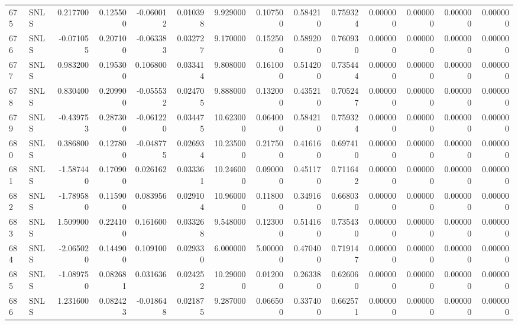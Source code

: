 \begin{tabular}{llrrrrrrrrrrrr}
675 &   SNLS &  0.217700 &      0.125500 & -0.060012 &    0.010398 &   9.929000 &      0.107500 &   0.584210 &  0.759324 &  0.000000 &   0.000000 &     0.000000 &     0.000000 \\
676 &   SNLS & -0.071055 &      0.207100 & -0.063383 &    0.032727 &   9.170000 &      0.152500 &   0.589200 &  0.760930 &  0.000000 &   0.000000 &     0.000000 &     0.000000 \\
677 &   SNLS &  0.983200 &      0.195300 &  0.106800 &    0.033414 &   9.808000 &      0.161000 &   0.514200 &  0.735444 &  0.000000 &   0.000000 &     0.000000 &     0.000000 \\
678 &   SNLS &  0.830400 &      0.209900 & -0.055532 &    0.024705 &   9.888000 &      0.132000 &   0.435210 &  0.705247 &  0.000000 &   0.000000 &     0.000000 &     0.000000 \\
679 &   SNLS & -0.439753 &      0.287300 & -0.061220 &    0.034475 &  10.623000 &      0.064000 &   0.584210 &  0.759324 &  0.000000 &   0.000000 &     0.000000 &     0.000000 \\
680 &   SNLS &  0.386800 &      0.127800 & -0.048775 &    0.026934 &  10.235000 &      0.217500 &   0.416160 &  0.697410 &  0.000000 &   0.000000 &     0.000000 &     0.000000 \\
681 &   SNLS & -1.587440 &      0.170900 &  0.026162 &    0.033361 &  10.246000 &      0.090000 &   0.451170 &  0.711642 &  0.000000 &   0.000000 &     0.000000 &     0.000000 \\
682 &   SNLS & -1.789580 &      0.115900 &  0.083956 &    0.029104 &  10.960000 &      0.118000 &   0.349160 &  0.668030 &  0.000000 &   0.000000 &     0.000000 &     0.000000 \\
683 &   SNLS &  1.509900 &      0.224100 &  0.161600 &    0.033268 &   9.548000 &      0.123000 &   0.514160 &  0.735430 &  0.000000 &   0.000000 &     0.000000 &     0.000000 \\
684 &   SNLS & -2.065020 &      0.144900 &  0.109100 &    0.029330 &   6.000000 &      5.000000 &   0.470400 &  0.719147 &  0.000000 &   0.000000 &     0.000000 &     0.000000 \\
685 &   SNLS & -1.089750 &      0.082681 &  0.031636 &    0.024252 &  10.290000 &      0.012000 &   0.263380 &  0.626060 &  0.000000 &   0.000000 &     0.000000 &     0.000000 \\
686 &   SNLS &  1.231600 &      0.082423 & -0.018648 &    0.021875 &   9.287000 &      0.066500 &   0.337400 &  0.662571 &  0.000000 &   0.000000 &     0.000000 &     0.000000 \\

\end{tabular}
